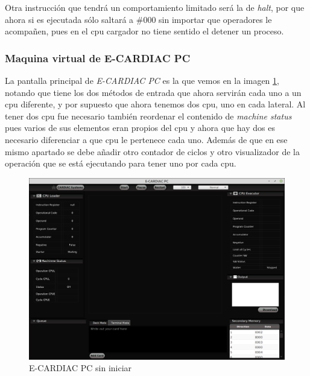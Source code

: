 \documentclass[letterpaper,12pt,oneside]{book}
\begin{document}
			Otra instrucción que tendrá un comportamiento limitado será la de \textit{halt}, por que ahora si es ejecutada sólo saltará a \#000 sin importar
			que operadores le acompañen, pues en el cpu cargador no tiene sentido el detener un proceso.
			

			
			\subsubsection{ Maquina virtual de E-CARDIAC PC}
			
			La pantalla principal de \textit{E-CARDIAC PC} es la que vemos en la imagen \ref{fig:ecaridacpc_sininiciar}, notando que tiene los dos métodos
			de entrada que ahora servirán cada uno a un cpu diferente, y por supuesto que ahora tenemos dos cpu, uno en cada lateral. Al tener dos cpu fue necesario
			también reordenar el contenido de \textit{machine status} pues varios de sus elementos eran propios del cpu y ahora que hay dos es necesario
			diferenciar a que cpu le pertenece cada uno. Además de que en ese mismo apartado se debe añadir otro contador de ciclos y otro
			visualizador de la operación que se está ejecutando para tener uno por cada cpu.
			
			
			\begin{figure}[h]		
				\centering
				\includegraphics[scale=0.36]{media/Paralela/ecaridacpc_sininiciar.png}
				\caption{ E-CARDIAC PC sin iniciar}
				\label{fig:ecaridacpc_sininiciar}
			\end{figure}	
\end{document}
